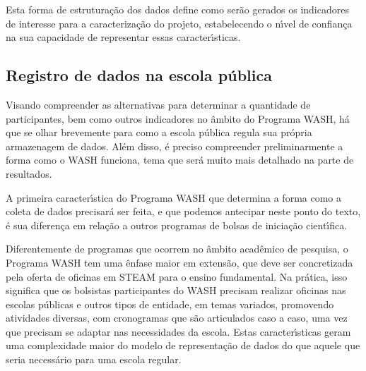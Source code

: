\documentclass[
12pt,		%
openright,	%
twoside,  %
a4paper,			%
chapter=TITLE,		%
english,			%
french,				%
spanish,			%
brazil				%
]{USPSC-classe/USPSC}
\begin{document}
Esta forma de estrutura\c{c}\~ao dos dados define como ser\~ao gerados os indicadores de interesse para a caracteriza\c{c}\~ao do projeto, estabelecendo o n\'{\i}vel de confian\c{c}a na sua capacidade de representar essas caracter\'{\i}sticas.










\subsection[Registro de dados na escola p\'ublica]{Registro de dados na escola p\'ublica}\label{Registro de dados na escola p\'ublica}
Visando compreender as alternativas para determinar a quantidade de participantes, bem como outros indicadores no \^ambito do Programa WASH, h\'a que se olhar brevemente para como a escola p\'ublica regula sua pr\'opria armazenagem de dados. Al\'em disso, \'e preciso compreender preliminarmente a forma como o WASH funciona, tema que ser\'a muito mais detalhado na parte de resultados.










A primeira caracter\'{\i}stica do Programa WASH que determina a forma como a coleta de dados precisar\'a ser feita, e que podemos antecipar neste ponto do texto, \'e sua diferen\c{c}a em rela\c{c}\~ao a outros programas de bolsas de inicia\c{c}\~ao cient\'{\i}fica.










Diferentemente de programas que ocorrem no \^ambito acad\^emico de pesquisa, o Programa WASH tem uma \^enfase maior em extens\~ao, que deve ser concretizada pela oferta de oficinas em STEAM para o ensino fundamental. Na pr\'atica, isso significa que os bolsistas participantes do WASH precisam realizar oficinas nas escolas p\'ublicas e outros tipos de entidade, em temas variados, promovendo atividades diversas, com cronogramas que s\~ao articulados caso a caso, uma vez que precisam se adaptar nas necessidades da escola. Estas caracter\'{\i}sticas geram uma complexidade maior do modelo de representa\c{c}\~ao de dados do que aquele que seria necess\'ario para uma escola regular.
\end{document}
